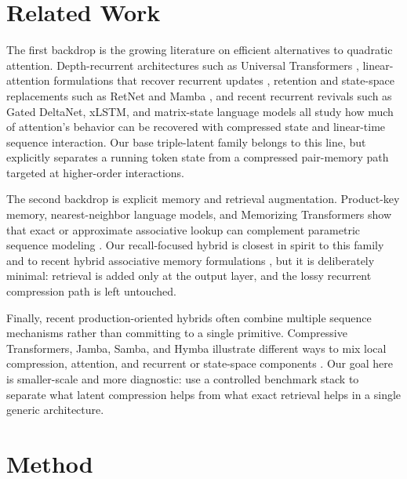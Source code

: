 \documentclass[11pt]{article}
\begin{document}
\section{Related Work}
The first backdrop is the growing literature on efficient alternatives to
quadratic attention. Depth-recurrent architectures such as Universal
Transformers \citep{dehghani2019universal}, linear-attention formulations that
recover recurrent updates \citep{katharopoulos2020transformers}, retention and
state-space replacements such as RetNet and Mamba
\citep{retnet2023, mamba2023}, and recent recurrent revivals such as
Gated DeltaNet, xLSTM, and matrix-state language models
\citep{gateddeltanet2026, beck2024xlstm, m2rnn2026} all study how much of
attention's behavior can be recovered with compressed state and linear-time
sequence interaction. Our base triple-latent family belongs to this line, but
explicitly separates a running token state from a compressed pair-memory path
targeted at higher-order interactions.

The second backdrop is explicit memory and retrieval augmentation. Product-key
memory, nearest-neighbor language models, and Memorizing Transformers show that
exact or approximate associative lookup can complement parametric sequence
modeling \citep{lample2019productkeys, khandelwal2019knnlm, memorizing2022}.
Our recall-focused hybrid is closest in spirit to this family and to recent
hybrid associative memory formulations \citep{ham2026}, but it is deliberately
minimal: retrieval is added only at the output layer, and the lossy recurrent
compression path is left untouched.

Finally, recent production-oriented hybrids often combine multiple sequence
mechanisms rather than committing to a single primitive. Compressive
Transformers, Jamba, Samba, and Hymba illustrate different ways to mix local
compression, attention, and recurrent or state-space components
\citep{compressive2019, jamba2024, samba2024, hymba2024}. Our goal here is
smaller-scale and more diagnostic: use a controlled benchmark stack to separate
what latent compression helps from what exact retrieval helps in a single
generic architecture.

\section{Method}
\end{document}
